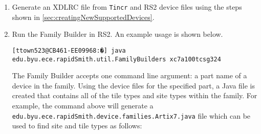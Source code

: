 \begin {enumerate}
\begin{enumerate}
    \end{enumerate}
    
    \bigbreak \noindent
	\begin{large}
	\textbf{Other Devices}
	\end{large}
	  	
  	\noindent UltraScale and later devices require only one hand edit: adding 
  	missing compatible types (most compatible types can be determined
  	automatically). The XML listings below show the two compatible types that
  	were manually added in order to complete the Kintex UltraScale family info.

\begin{lstlisting}[numbers=none]
    <site_type>
      <name>SLICEL</name>
      <is_slice/>
      |\textbf{<compatible\_types>}|
        |\textbf{<compatible\_type>SLICEM</compatible\_type>}|
      |\textbf{</compatible\_types>}|
\end{lstlisting}  

\begin{lstlisting}[numbers=none]
    <site_type>
      <name>HRIO</name> 
      <is_iob/>
      |\textbf{<compatible\_types>}|
        |\textbf{<compatible\_type>HPIOB</compatible\_type>}|
      |\textbf{</compatible\_types>}|
\end{lstlisting} 
   
	\noindent For other device families, you may have to add additional compatible
	sites. It is up to you to determine what compatible sites need to be added
	through experimentation.
    	 
	\item Generate an XDLRC file from \texttt{Tincr} and RS2 device
	files using the steps shown in \autoref{sec:creatingNewSupportedDevices}.
	    
	\item Run the Family Builder in RS2. An example usage is shown below.

\begin{lstlisting}[numbers=none]
[ttown523@CB461-EE09968:�] java edu.byu.ece.rapidSmith.util.FamilyBuilders xc7a100tcsg324
\end{lstlisting}

	\noindent The Family Builder accepts one command line argument: a part name of
	a device in the family. Using the device files for the specified part, a Java
	file is created that contains all of the tile types and site types within
	the family. For example, the command above will generate a
	\texttt{edu.byu.ece.rapidSmith.device.families.Artix7.java} file which can
	be used to find site and tile types as follows:
    

\end{enumerate}
